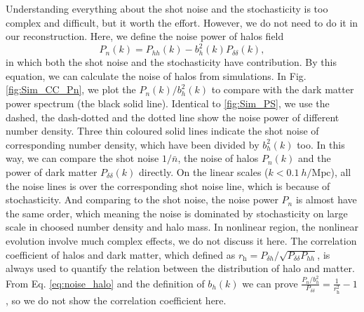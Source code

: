  Understanding everything about the shot noise and the stochasticity is too
 complex and difficult, but it worth the effort. 
 However, we do not need to do it in our reconstruction. 
 Here, we define the noise power of halos field
\begin{equation}
P_{n}(k)=P_{hh}(k)-b^{2}_{h}(k)P_{\delta\delta}(k),
\label{eq:noise_halo}
\end{equation}
in which both the shot noise and the stochasticity have contribution.
By this equation, we can calculate the noise of halos from simulations.
In Fig. \ref{fig:Sim_CC_Pn}, we plot the $P_{n}(k)/b_{h}^{2}(k)$ 
to compare with
the dark matter power spectrum (the black solid line).
Identical to \ref{fig:Sim_PS}, we use the dashed, the dash-dotted 
and the dotted line show the noise power of different number density.
Three thin coloured solid lines indicate the shot noise of corresponding number density, which have been divided by $b^2_{h}(k)$ too. 
In this way, we can compare the shot noise $1/\bar{n}$, the noise of 
halos $P_{n}(k)$ and the power of dark matter $P_{\delta\delta}(k)$ directly.
On the linear scales ($k<0.1\ h/\mathrm{Mpc}$), all the noise lines is over
the corresponding shot noise line, which is because of stochasticity.
And comparing to the shot noise, the noise power $P_{n}$ is almost have 
the same order, which meaning the noise is dominated by stochasticity
on large scale in choosed number density and halo mass.
 In nonlinear region, the nonlinear
evolution involve much complex effects, we do not discuss it here.
The correlation coefficient of halos and dark matter,
which defined as $r_{\mathrm{h}}=P_{\delta h}/\sqrt{P_{\delta\delta}P_{hh}}$, is always
used to quantify the relation between the distribution of halo and matter.
 From Eq. \ref{eq:noise_halo} and the definition of $b_{h}(k)$ we can prove 
$\frac{P_{n}/b_{h}^2}{P_{\delta\delta}}=\frac{1}{r_{\mathrm{h}}^2}-1$,
so we do not show the correlation coefficient here.
\\

